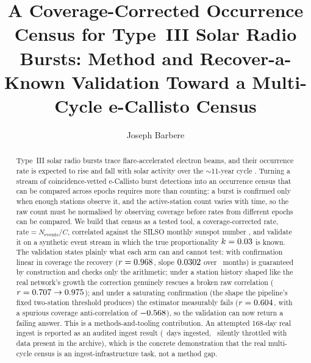\documentclass[twocolumn]{aastex631}
\begin{document}
\title{A Coverage-Corrected Occurrence Census for Type~III Solar Radio Bursts:
Method and Recover-a-Known Validation Toward a Multi-Cycle e-Callisto Census}

\author[0009-0008-3289-4447]{Joseph Barbere}

\begin{abstract}
Type~III solar radio bursts trace flare-accelerated electron beams, and their occurrence rate is
expected to rise and fall with solar activity over the $\sim$11-year cycle
\citep{sainthilaire2013,reid2014}. Turning a stream of coincidence-vetted e-Callisto \citep{benz2009}
burst detections into an occurrence census that can be compared across epochs requires more than
counting: a burst is confirmed only when enough stations observe it, and the active-station count
varies with time, so the raw count must be normalised by observing coverage before rates from
different epochs can be compared. We build that census as a tested tool, a coverage-corrected rate,
$\mathrm{rate}=N_\mathrm{events}/C$, correlated against the SILSO monthly sunspot number
\citep{clette2014,silso2015}, and validate it on a synthetic event stream in which the true
proportionality $k=0.03$ is known. The validation states plainly what each arm can and
cannot test: with confirmation linear in coverage the recovery ($r=0.968$, slope
$0.0302$ over \ecsSynNperiods\ months) is guaranteed by construction and checks only the
arithmetic; under a station history shaped like the real network's growth the correction genuinely
rescues a broken raw correlation ($r=0.707\to0.975$); and under
a saturating confirmation (the shape the pipeline's fixed two-station threshold produces)
the estimator measurably fails ($r=0.604$, with a spurious coverage
anti-correlation of $-0.568$), so the validation can now return a failing answer. This
is a methods-and-tooling contribution. An attempted 168-day real ingest is reported as an audited
ingest result (\ecsRealNdaysIngested\ days ingested, \ecsRealNdaysFailed\ silently throttled
with data present in the archive), which is the concrete demonstration that the real multi-cycle
census is an ingest-infrastructure task, not a method gap.
\end{abstract}

\end{document}
